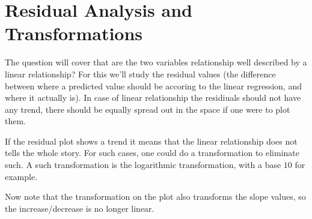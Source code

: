 \section{Residual Analysis and Transformations}

The question will cover that are the two variables relationship well described
by a linear relationship? For this we'll study the residual values (the
difference between where a predicted value should be accoring to the linear
regression, and where it actually is). In case of linear relationship the
residiuals should not have any trend, there should be equally spread out in the
space if one were to plot them.

If the residual plot shows a trend it means that the linear relationship does
not tells the whole story. For such cases, one could do a transformation to
eliminate such. A such transformation is the logarithmic transformation, with a
base $10$ for example.

Now note that the transformation on the plot also transforms the slope values,
so the increase/decrease is no longer linear.
